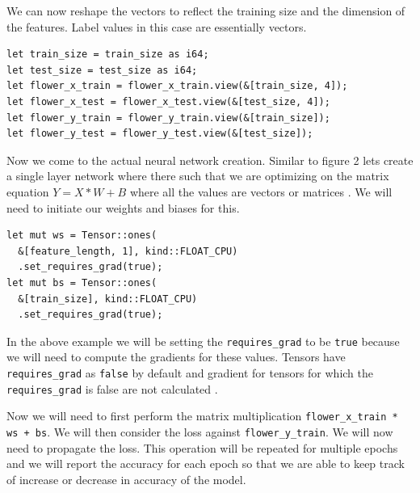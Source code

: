 \documentclass{book}
\begin{document}
We can now reshape the vectors to reflect the training size and the dimension of the features. Label values in this case are essentially vectors.

\begin{lstlisting}[caption={chapter3\\/iris\_classification\_tchrs\\/src\\/main\\.rs}]
let train_size = train_size as i64;
let test_size = test_size as i64;
let flower_x_train = flower_x_train.view(&[train_size, 4]);
let flower_x_test = flower_x_test.view(&[test_size, 4]);
let flower_y_train = flower_y_train.view(&[train_size]);
let flower_y_test = flower_y_test.view(&[test_size]);
\end{lstlisting}

Now we come to the actual neural network creation. Similar to figure 2 lets create a single layer network where there such that we are optimizing on the matrix equation $Y = X * W + B$ where all the values are vectors or matrices\cite{WEBSITE:17} . We will need to initiate our weights and biases for this.

\begin{lstlisting}[caption={chapter3\\/iris\_classification\_tchrs\\/src\\/main\\.rs}]
let mut ws = Tensor::ones(
  &[feature_length, 1], kind::FLOAT_CPU)
  .set_requires_grad(true);
let mut bs = Tensor::ones(
  &[train_size], kind::FLOAT_CPU)
  .set_requires_grad(true);
\end{lstlisting}

In the above example we will be setting the \lstinline{requires_grad} to be \lstinline{true} because we will need to compute the gradients for these values. Tensors have \lstinline{requires_grad} as \lstinline{false} by default and gradient for tensors for which the \lstinline{requires_grad} is false are not calculated\cite{WEBSITE:15} .

Now we will need to first perform the matrix multiplication \lstinline{flower_x_train * ws + bs}. We will then consider the loss against \lstinline{flower_y_train}. We will now need to propagate the loss. This operation will be repeated for multiple epochs and we will report the accuracy for each epoch so that we are able to keep track of increase or decrease in accuracy of the model.
\end{document}
